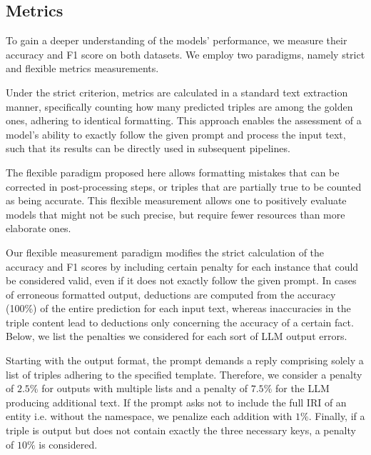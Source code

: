 \documentclass[runningheads]{llncs}
\begin{document}
\subsection{Metrics}
\label{seq:metrics}

To gain a deeper understanding of the models' performance, we measure their accuracy and F1 score on both datasets. We employ two paradigms, namely strict and flexible metrics measurements.
 
Under the strict criterion, metrics are calculated in a standard text extraction manner, specifically counting how many predicted triples are among the golden ones, adhering to identical formatting. This approach enables the assessment of a model's ability to exactly follow the given prompt and process the input text, such that its results can be directly used in subsequent pipelines. 

The flexible paradigm proposed here allows  formatting mistakes that can be corrected in post-processing steps, or triples that are partially true to be counted as being accurate. This flexible measurement allows one to positively evaluate models that might not be such precise, but require fewer resources than more elaborate ones. 

Our flexible measurement paradigm modifies the strict calculation of the accuracy and F1 scores by including certain penalty for each instance that could be considered valid, even if it does not exactly follow the given prompt.  
In cases of erroneous formatted output, deductions are computed from the accuracy (100\%) of the entire prediction for each input text, whereas inaccuracies in the triple content lead to deductions only concerning the accuracy of a certain fact.
Below, we list the penalties we considered for each sort of LLM output errors.

Starting with the output format, the prompt demands a reply comprising solely a list of triples adhering to the specified template. Therefore, we consider a penalty of $2.5\%$ for outputs with multiple lists and a penalty of $7.5\%$ for the LLM producing additional text. 
If the prompt asks not to include the full IRI of an entity i.e. without the namespace, we penalize each addition with $1\%$. Finally, if a triple is output but does not contain exactly the three necessary keys, a penalty of $10\%$ is considered.  
\end{document}
